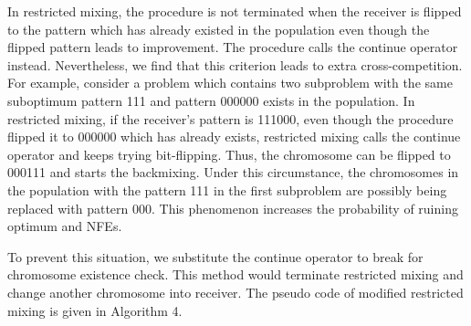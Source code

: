 \documentclass{sig-alternate-05-2015}
\begin{document}
In restricted mixing, the procedure is not terminated when the receiver is flipped to the pattern which has already existed in the population even though the flipped pattern leads to improvement. The procedure calls the continue operator instead. Nevertheless, we find that this criterion leads to extra cross-competition. For example, consider a problem which contains two subproblem with the same suboptimum pattern 111 and pattern 000000 exists in the population. In restricted mixing, if the receiver’s pattern is 111000, even though the procedure flipped it to 000000 which has already exists, restricted mixing calls the continue operator and keeps trying bit-flipping. Thus, the chromosome can be flipped to 000111 and starts the backmixing. Under this circumstance, the chromosomes in the population with the pattern 111 in the first subproblem are possibly being replaced with pattern 000. This phenomenon increases the probability of ruining optimum and NFEs. 


To prevent this situation, we substitute the continue operator to break for chromosome existence check. This method would terminate restricted mixing and change another chromosome into receiver. The pseudo code of modified restricted mixing is given in Algorithm 4. 
\end{document}
